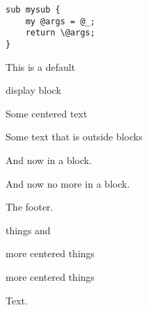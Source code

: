 \begin{verbatim}
sub mysub {
    my @args = @_;
    return \@args;
}
\end{verbatim}
This is a default

display block

\begin{center}
Some centered text
\end{center}

Some text that is outside blocks

And now in a block.

And now no more in a block.
\begin{center}
The footer.
\end{center}
things and
\begin{center}
more centered things
\end{center}
\begin{center}
more centered things
\end{center}
Text.

